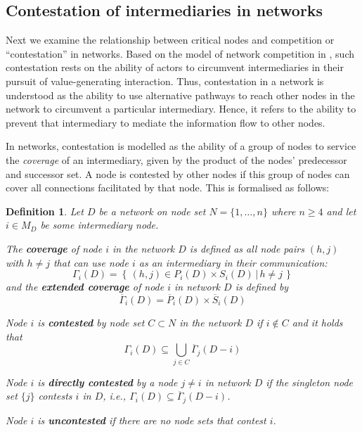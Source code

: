 \documentclass[11pt,fleqn]{article}
\newcounter{llst}
\newenvironment{abet}{\begin{list}{\rm (\alph{llst})}{\usecounter{llst}
\setlength{\itemindent}{0em} \setlength{\leftmargin}{3em}
\setlength{\labelwidth}{2em} \setlength{\labelsep}{1em}}}{\end{list}}
\newtheorem{definition}[theorem]{Definition}
\begin{document}
\subsection{Contestation of intermediaries in networks}

Next we examine the relationship between critical nodes and competition or ``contestation'' in networks. Based on the model of network competition in \citet{GillesDiamantaris2013}, such contestation rests on the ability of actors to circumvent intermediaries in their pursuit of value-generating interaction. Thus, contestation in a network is understood as the ability to use alternative pathways to reach other nodes in the network to circumvent a particular intermediary. Hence, it refers to the ability to prevent that intermediary to mediate the information flow to other nodes.

In networks, contestation is modelled as the ability of a group of nodes to service the \emph{coverage} of an intermediary, given by the product of the nodes' predecessor and successor set. A node is contested by other nodes if this group of nodes can cover all connections facilitated by that node. This is formalised as follows:

\begin{definition} \label{Contested}
Let $D$ be a network on node set $N=\{1, \ldots ,n\}$ where $n \geqslant 4$ and let $i \in M_D$ be some intermediary node.
\begin{abet}
\item The \textbf{coverage} of node $i$ in the network $D$ is defined as all node pairs $(h,j)$ with $h \neq j$ that can use node $i$ as an intermediary in their communication:
\begin{equation}
	\Gamma_i (D) = \left\{ \left. \, (h,j) \in P_i (D) \times S_i (D) \, \right| \, h \neq j \, \right\}
\end{equation}
and the \textbf{extended coverage} of node $i$ in network $D$ is defined by
\begin{equation}
	\overline{\Gamma}_i (D) = \overline{P}_i (D) \times \overline{S}_i (D)
\end{equation}
\item Node $i$ is \textbf{contested} by node set $C \subset N$ in the network $D$ if $i \notin C$ and it holds that
\begin{equation} \label{Group Contested}
\Gamma_i (D) \subseteq \bigcup_{j \in C} \overline{\Gamma}_j (D-i)
\end{equation}

\item Node $i$ is \textbf{directly contested} by a node $j \neq i$ in network $D$ if the singleton node set $\{ j \}$ contests $i$ in $D$, i.e., $\Gamma_i (D) \subseteq \overline{\Gamma}_j (D-i)$.

\item Node $i$ is \textbf{uncontested} if there are no node sets that contest $i$.
\end{abet}
\end{definition}
\end{document}

